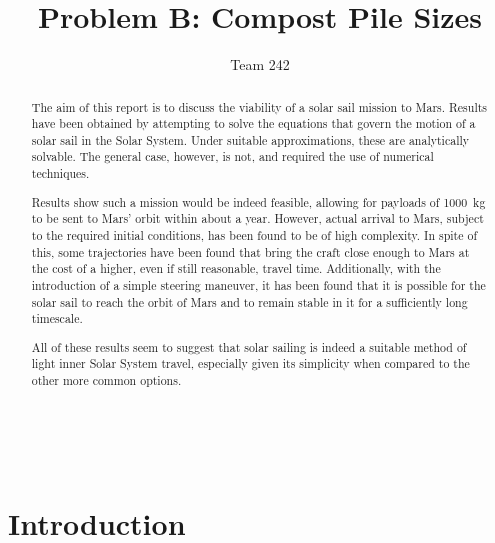 \documentclass[12pt, a4paper, twocolumn]{article}
\title{\sffamily \bfseries Problem B: Compost Pile Sizes}
\author{\sffamily Team 242}
\date{}
\numberwithin{table}{section}
\numberwithin{figure}{section}
\numberwithin{equation}{section}
\begin{document}
\renewcommand{\abstractname}{}
\renewcommand{\absnamepos}{empty}
\begin{titlingpage}
 \maketitle

\noindent \hrulefill \\
\begin{abstract}
The aim of this report is to discuss the viability of a solar sail mission to Mars. Results have been obtained by attempting to solve the equations that govern the motion of a solar sail in the Solar System. Under suitable approximations, these are analytically solvable. The general case, however, is not, and required the use of numerical techniques. 

Results show such a mission would be indeed feasible, allowing for payloads of \SI{1000}{kg} to be sent to Mars' orbit within about a year. However, actual arrival to Mars, subject to the required initial conditions, has been found to be of high complexity. In spite of this, some trajectories have been found that bring the craft close enough to Mars at the cost of a higher, even if still reasonable, travel time. Additionally, with the introduction of a simple steering maneuver, it has been found that it is possible for the solar sail to reach the orbit of Mars and to remain stable in it for a sufficiently long timescale.

All of these results seem to suggest that solar sailing is indeed a suitable method of light inner Solar System travel, especially given its simplicity when compared to the other more common options. 
\end{abstract}
\hrulefill
\end{titlingpage}

\begin{titlingpage}
\tableofcontents
\end{titlingpage}

\section{Introduction}
\cite{mason}
\end{document}
